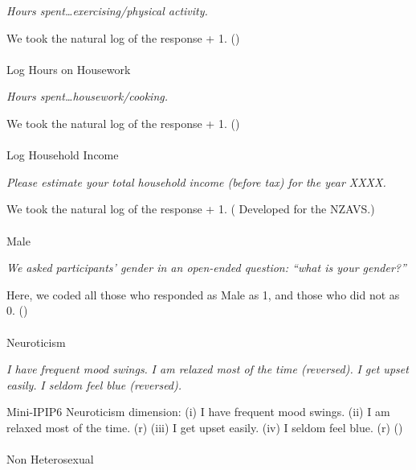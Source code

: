 \documentclass[
  single column]{article}
\makeatletter
\let\oldparagraph\paragraph
\renewcommand{\paragraph}{
    \@ifstar
      \xxxParagraphStar
      \xxxParagraphNoStar
  }
\newcommand{\xxxParagraphStar}[1]{\oldparagraph*{#1}\mbox{}}
\newcommand{\xxxParagraphNoStar}[1]{\oldparagraph{#1}\mbox{}}
\makeatother
\begin{document}
\emph{Hours spent\ldots exercising/physical activity.}

We took the natural log of the response + 1.
()

\paragraph{Log Hours on Housework}\label{log-hours-on-housework}

\emph{Hours spent\ldots housework/cooking.}

We took the natural log of the response + 1.
()

\paragraph{Log Household Income}\label{log-household-income}

\emph{Please estimate your total household income (before tax) for the
year XXXX.}

We took the natural log of the response + 1.
( Developed for the
NZAVS.)

\paragraph{Male}\label{male}

\emph{We asked participants' gender in an open-ended question: ``what is
your gender?''}

Here, we coded all those who responded as Male as 1, and those who did
not as 0. ()

\paragraph{Neuroticism}\label{neuroticism}

\emph{I have frequent mood swings.} \emph{I am relaxed most of the time
(reversed).} \emph{I get upset easily.} \emph{I seldom feel blue
(reversed).}

Mini-IPIP6 Neuroticism dimension: (i) I have frequent mood swings. (ii)
I am relaxed most of the time. (r) (iii) I get upset easily. (iv) I
seldom feel blue. (r) ()

\paragraph{Non Heterosexual}\label{non-heterosexual}
\end{document}
